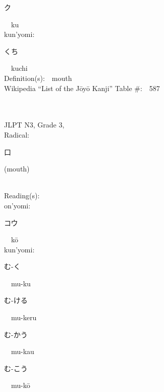 \begin{multicols}{2}
{\hspace*{2em}}{\begin{CJK}{UTF8}{min} ク \end{CJK}}\ \ ku\ \ \\
{\hspace*{1em}}kun'yomi:\ \ \\
{\hspace*{2em}}{\begin{CJK}{UTF8}{min} くち \end{CJK}}\ \ kuchi\ \ \\
Definition(s):\ \ mouth \\
Wikipedia ``List of the J\=oy\=o Kanji'' Table \#:\ \ 587 \\
\ \ \\
{\fontsize{34pt}{40pt}  }\ \ \\  %
{JLPT N3, Grade 3, \\Radical:\ \ {\begin{CJK}{UTF8}{min} 口 \end{CJK}} (mouth) } \\
Reading(s):\ \ \\
{\hspace*{1em}}on'yomi:\ \ \\
{\hspace*{2em}}{\begin{CJK}{UTF8}{min} コウ \end{CJK}}\ \ k\=o\ \ \\
{\hspace*{1em}}kun'yomi:\ \ \\
{\hspace*{2em}}{\begin{CJK}{UTF8}{min} む-く \end{CJK}}\ \ mu-ku\ \ \\
{\hspace*{2em}}{\begin{CJK}{UTF8}{min} む-ける \end{CJK}}\ \ mu-keru\ \ \\
{\hspace*{2em}}{\begin{CJK}{UTF8}{min} む-かう \end{CJK}}\ \ mu-kau\ \ \\
{\hspace*{2em}}{\begin{CJK}{UTF8}{min} む-こう \end{CJK}}\ \ mu-k\=o\ \ \\

\end{multicols}

